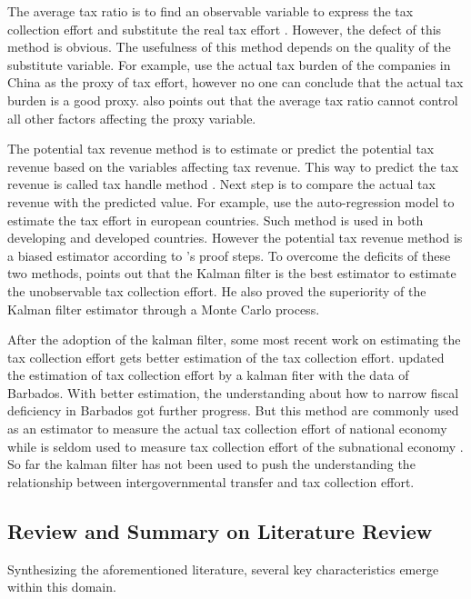 The average tax ratio is to find an observable variable to express the tax collection effort and substitute the real tax effort \parencite{1981Taxation,1996Revenue1}. However, the defect of this method is obvious. The usefulness of this method depends on the quality of the substitute variable. For example, \textcite{lv2008taxeffort} use the actual tax burden of the companies in China as the proxy of tax effort, however no one can conclude that the actual tax burden is a good proxy. \textcite{doi:10.1080/13504850500425345} also points out that the average tax ratio cannot control all other factors affecting the proxy variable.

The potential tax revenue method is to estimate or predict the potential tax revenue based on the variables affecting tax revenue. This way to predict the tax revenue is called tax handle method \parencite{1968How}. Next step is to compare the actual tax revenue with the predicted value. For example, \Textcite{2019AAAVVV} use the auto-regression model to estimate the tax effort in european countries. Such method is used in both developing and developed countries\parencite{2002The,2007Determinants,201703}. However the potential tax revenue method is a biased estimator according to \textcite{doi:10.1080/13504850500425345}'s proof steps. To overcome the deficits of these two methods, \textcite{doi:10.1080/13504850500425345} points out that the Kalman filter is the best estimator to estimate the unobservable tax collection effort. He also proved the superiority of the Kalman filter estimator through a Monte Carlo process.

After the adoption of the kalman filter, some most recent work on estimating the tax collection effort gets better estimation of the tax collection effort. \Textcite{2010MEASURING} updated the estimation of tax collection effort by a kalman fiter with the data of Barbados. With better estimation,  the understanding about how to narrow fiscal deficiency in Barbados got further progress. But this method are commonly used as an estimator to measure the actual tax collection effort of national economy while is seldom used to measure tax collection effort of the subnational economy \parencite{W2007Measuring}. So far the kalman filter has not been used to push the understanding the relationship between intergovernmental transfer and tax collection effort.


\subsection{Review and Summary on Literature Review}
Synthesizing the aforementioned literature, several key characteristics emerge within this domain.

